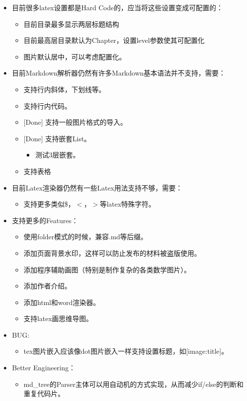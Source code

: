 \documentclass[export, 12pt, letterpaper]{ctexrep}
\begin{document}
\begin{itemize}
\item{ 目前很多latex设置都是Hard Code的，应当将这些设置变成可配置的：
\begin{itemize}
\item{ 目前目录最多显示两层标题结构 }
\item{ 目前最高层目录默认为Chapter，设置level参数使其可配置化 }
\item{ 图片默认居中，可以考虑配置化。 }
\end{itemize}
 }
\item{ 目前Markdown解析器仍然有许多Markdown基本语法并不支持，需要：
\begin{itemize}
\item{ 支持行内斜体，下划线等。 }
\item{ 支持行内代码。 }
\item{ [Done] 支持一般图片格式的导入。 }
\item{ [Done] 支持嵌套List。
\begin{itemize}
\item{ 测试3层嵌套。 }
\end{itemize}
 }
\item{ 支持表格 }
\end{itemize}
 }
\item{ 目前Latex渲染器仍然有一些Latex用法支持不够，需要：
\begin{itemize}
\item{ 支持更多类似\$，$<$，$>$等latex特殊字符。 }
\end{itemize}
 }
\item{ 支持更多的Features：
\begin{itemize}
\item{ 使用folder模式的时候，兼容.md等后缀。 }
\item{ 添加页面背景水印，这样可以防止发布的材料被盗版使用。 }
\item{ 添加程序辅助画图（特别是制作复杂的各类数学图片）。 }
\item{ 添加作者介绍。 }
\item{ 添加html和word渲染器。 }
\item{ 支持latex画思维导图。 }
\end{itemize}
 }
\item{ BUG:
\begin{itemize}
\item{ tex图片嵌入应该像dot图片嵌入一样支持设置标题，如[image:title]。 }
\end{itemize}
 }
\item{ Better Engineering：
\begin{itemize}
\item{ md\_tree的Parser主体可以用自动机的方式实现，从而减少if/else的判断和重复代码片。 }
\end{itemize}
 }
\end{itemize}
\end{document}
